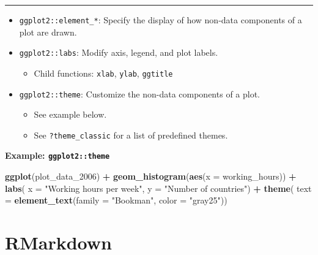\documentclass[
]{book}
\newenvironment{Shaded}{\begin{snugshade}}{\end{snugshade}}
\newcommand{\DataTypeTok}[1]{\textcolor[rgb]{0.13,0.29,0.53}{#1}}
\newcommand{\DecValTok}[1]{\textcolor[rgb]{0.00,0.00,0.81}{#1}}
\newcommand{\KeywordTok}[1]{\textcolor[rgb]{0.13,0.29,0.53}{\textbf{#1}}}
\newcommand{\NormalTok}[1]{#1}
\newcommand{\OperatorTok}[1]{\textcolor[rgb]{0.81,0.36,0.00}{\textbf{#1}}}
\newcommand{\StringTok}[1]{\textcolor[rgb]{0.31,0.60,0.02}{#1}}
\providecommand{\tightlist}{%
  \setlength{\itemsep}{0pt}\setlength{\parskip}{0pt}}
\begin{document}
\begin{center}\rule{0.5\linewidth}{0.5pt}\end{center}

\begin{itemize}
\tightlist
\item
  \texttt{ggplot2::element\_*}: Specify the display of how non-data components of a plot are drawn.
\item
  \texttt{ggplot2::labs}: Modify axis, legend, and plot labels.

  \begin{itemize}
  \tightlist
  \item
    Child functions: \texttt{xlab}, \texttt{ylab}, \texttt{ggtitle}
  \end{itemize}
\item
  \texttt{ggplot2::theme}: Customize the non-data components of a plot.

  \begin{itemize}
  \tightlist
  \item
    See example below.
  \item
    See \texttt{?theme\_classic} for a list of predefined themes.
  \end{itemize}
\end{itemize}

\textbf{Example: \texttt{ggplot2::theme}}

\begin{Shaded}
\begin{Highlighting}[]
\KeywordTok{ggplot}\NormalTok{(plot_data_}\DecValTok{2006}\NormalTok{) }\OperatorTok{+}
\StringTok{  }\KeywordTok{geom_histogram}\NormalTok{(}\KeywordTok{aes}\NormalTok{(}\DataTypeTok{x =}\NormalTok{ working_hours)) }\OperatorTok{+}
\StringTok{  }\KeywordTok{labs}\NormalTok{(}
    \DataTypeTok{x =} \StringTok{"Working hours per week"}\NormalTok{,}
    \DataTypeTok{y =} \StringTok{"Number of countries"}\NormalTok{) }\OperatorTok{+}
\StringTok{  }\KeywordTok{theme}\NormalTok{(}
    \DataTypeTok{text =} \KeywordTok{element_text}\NormalTok{(}\DataTypeTok{family =} \StringTok{"Bookman"}\NormalTok{, }\DataTypeTok{color =} \StringTok{"gray25"}\NormalTok{))}
\end{Highlighting}
\end{Shaded}

\hypertarget{rmarkdown}{%
\section{RMarkdown}\label{rmarkdown}}
\end{document}
